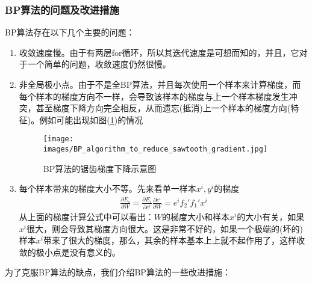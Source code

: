         \subsubsection{BP算法的问题及改进措施}
            \par
            BP算法存在以下几个主要的问题：
            \begin{enumerate}
            \item 收敛速度慢。由于有两层for循环，所以其迭代速度是可想而知的，并且，它对于一个简单的问题，收敛速度仍然很慢。
            \item 非全局极小点。由于不是全BP算法，并且每次使用一个样本来计算梯度，而每个样本的梯度方向不一样，会导致该样本的梯度与上一个样本梯度发生冲突，甚至梯度下降方向完全相反，从而遗忘(抵消)上一个样本的梯度方向(特征)。例如可能出现如图(\ref{fig:BP算法的锯齿梯度下降示意图})的情况
            \begin{figure}[H]
            \centering
            \texttt{[image: images/BP\_algorithm\_to\_reduce\_sawtooth\_gradient.jpg]}
            \caption{BP算法的锯齿梯度下降示意图}
            \label{fig:BP算法的锯齿梯度下降示意图}
            \end{figure}
            \item 每个样本带来的梯度大小不等。先来看单一样本$x^i,y^i$的梯度
            \begin{align*}
            \frac{\partial E_i}{\partial W }= \frac{\partial E_i}{\partial e^i}\frac{\partial e^i}{\partial W} = e^i f_2'f_1'x^i
            \end{align*}
            从上面的梯度计算公式中可以看出：$W$的梯度大小和样本$x^i$的大小有关，如果$x^i$很大，则会导致其梯度方向很大。这是非常不好的，如果一个极端的(坏的)样本$x^i$带来了很大的梯度，那么，其余的样本基本上上就不起作用了，这样收敛的极小点是没有意义的。
            \end{enumerate}
            为了克服BP算法的缺点，我们介绍BP算法的一些改进措施：
